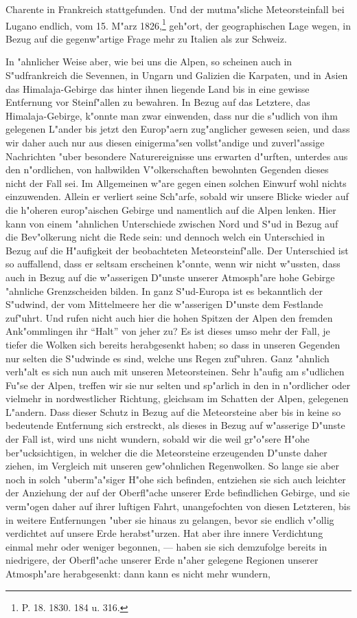 \documentclass[a4paper, 8pt, oneside, polutonikogreek, german]{article}
\begin{document}
Charente in Frankreich stattgefunden. Und der mutma"sliche Meteorsteinfall bei Lugano endlich, vom 15. M"arz 1826,\footnote{P. 18. 1830. 184 u. 316.} geh"ort, der geographischen Lage wegen, in Bezug auf die gegenw"artige Frage mehr zu Italien als zur Schweiz.

In "ahnlicher Weise aber, wie bei uns die Alpen, so scheinen auch in S"udfrankreich die Sevennen, in Ungarn und Galizien die Karpaten, und in Asien das Himalaja-Gebirge das hinter ihnen liegende Land bis in eine gewisse Entfernung vor Steinf"allen zu bewahren. In Bezug auf das Letztere, das Himalaja-Gebirge, k"onnte man zwar einwenden, dass nur die s"udlich von ihm gelegenen L"ander bis jetzt den Europ"aern zug"anglicher gewesen seien, und dass wir daher auch nur aus diesen einigerma"sen vollst"andige und zuverl"assige Nachrichten "uber besondere Naturereignisse uns erwarten d"urften, unterdes aus den n"ordlichen, von halbwilden V"olkerschaften bewohnten Gegenden dieses nicht der Fall sei. Im Allgemeinen w"are gegen einen solchen Einwurf wohl nichts einzuwenden. Allein er verliert seine Sch"arfe, sobald wir unsere Blicke wieder auf die h"oheren europ"aischen Gebirge und namentlich auf die Alpen lenken. Hier kann von einem "ahnlichen Unterschiede zwischen Nord und S"ud in Bezug auf die Bev"olkerung nicht die Rede sein: und dennoch welch ein Unterschied in Bezug auf die H"aufigkeit der beobachteten Meteorsteinf"alle. Der Unterschied ist so auffallend, dass er seltsam erscheinen k"onnte, wenn wir nicht w"ussten, dass auch in Bezug auf die w"asserigen D"unste unserer Atmosph"are hohe Gebirge "ahnliche Grenzscheiden bilden. In ganz S"ud-Europa ist es bekanntlich der S"udwind, der vom Mittelmeere her die w"asserigen D"unste dem Festlande zuf"uhrt. Und rufen nicht auch hier die hohen Spitzen der Alpen den fremden Ank"ommlingen ihr "`Halt"' von jeher zu? Es ist dieses umso mehr der Fall, je tiefer die Wolken sich bereits herabgesenkt haben; so dass in unseren Gegenden nur selten die S"udwinde es sind, welche uns Regen zuf"uhren. Ganz "ahnlich verh"alt es sich nun auch mit unseren Meteorsteinen. Sehr h"aufig am s"udlichen Fu"se der Alpen, treffen wir sie nur selten und sp"arlich in den in n"ordlicher oder vielmehr in nordwestlicher Richtung, gleichsam im Schatten der Alpen, gelegenen L"andern. Dass dieser Schutz in Bezug auf die Meteorsteine aber bis in keine so bedeutende Entfernung sich erstreckt, als dieses in Bezug auf w"asserige D"unste der Fall ist, wird uns nicht wundern, sobald wir die weil gr"o"sere H"ohe ber"ucksichtigen, in welcher die die Meteorsteine erzeugenden D"unste daher ziehen, im Vergleich mit unseren gew"ohnlichen Regenwolken. So lange sie aber noch in solch "uberm"a"siger H"ohe sich befinden, entziehen sie sich auch leichter der Anziehung der auf der Oberfl"ache unserer Erde befindlichen Gebirge, und sie verm"ogen daher auf ihrer luftigen Fahrt, unangefochten von diesen Letzteren, bis in weitere Entfernungen "uber sie hinaus zu gelangen, bevor sie endlich v"ollig verdichtet auf unsere Erde herabst"urzen. Hat aber ihre innere Verdichtung einmal mehr oder weniger begonnen, --- haben sie sich demzufolge bereits in niedrigere, der Oberfl"ache unserer Erde n"aher gelegene Regionen unserer Atmosph"are herabgesenkt: dann kann es nicht mehr wundern, 
\end{document}
